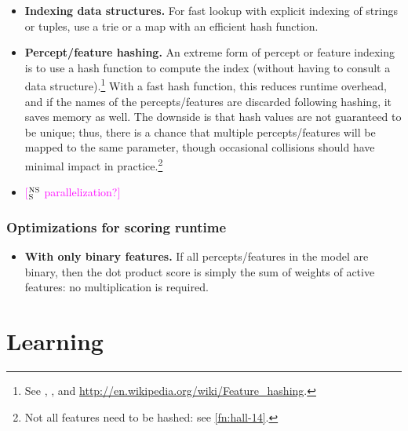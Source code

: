 \documentclass[11pt,letterpaper]{article}
\newcommand{\ensuretext}[1]{#1}
\newcommand{\nssmarker}{\ensuretext{\textcolor{magenta}{\ensuremath{^{\textsc{NS}}_{\textsc{S}}}}}}
\newcommand{\arkcomment}[3]{\ensuretext{\textcolor{#3}{[#1 #2]}}}
\newcommand{\nss}[1]{\arkcomment{\nssmarker}{#1}{magenta}}
\newcommand{\fnref}[1]{\autoref{#1}} %
\begin{document}
\begin{itemize}
  \item \textbf{Indexing data structures.} For fast lookup with explicit indexing of strings or tuples, 
use a trie or a map with an efficient hash function.

  \item \textbf{Percept/feature hashing.} An extreme form of percept or feature indexing is to use a hash function to compute the index 
(without having to consult a data structure).\footnote{See \citep{weinberger-09}, \citep{smola-10-hashing}, and \url{http://en.wikipedia.org/wiki/Feature_hashing}.}
With a fast hash function, this reduces runtime overhead, 
and if the names of the percepts\slash features are discarded following hashing, it saves memory as well.
The downside is that hash values are not guaranteed to be unique; 
thus, there is a chance that multiple percepts\slash features will 
be mapped to the same parameter, though occasional collisions should have minimal impact in practice.\footnote{Not all features 
need to be hashed: see \fnref{fn:hall-14}.}

  \item \nss{parallelization?}
\end{itemize}

\subsubsection{Optimizations for scoring runtime}

\begin{itemize}
\item \textbf{With only binary features.} If all percepts\slash features in the model are binary, 
then the dot product score is simply the sum of weights of active features: no multiplication is required.
\end{itemize}



\section{Learning}\label{sec:learning}
\end{document}
